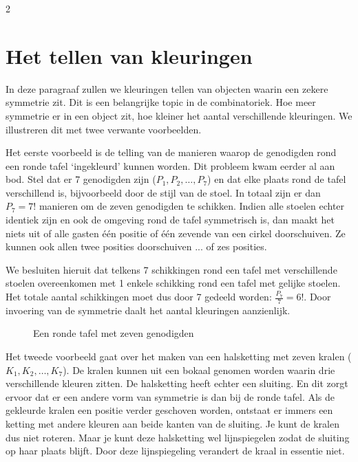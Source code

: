 \begin{multicols}{2}  
\section {Het tellen van kleuringen}
 
 In deze paragraaf zullen we kleuringen tellen van objecten waarin een zekere symmetrie zit. Dit is een belangrijke topic in de combinatoriek. Hoe meer symmetrie er in een object zit, hoe kleiner het aantal verschillende kleuringen. We illustreren dit met twee verwante voorbeelden.
 
 Het eerste voorbeeld is de telling van de manieren waarop de genodigden rond een ronde tafel `ingekleurd' kunnen worden. Dit probleem kwam eerder al aan bod. Stel dat er 7 genodigden zijn ($P_1, P_2, \dots, P_7$) en dat elke plaats rond de tafel verschillend is, bijvoorbeeld door de stijl van de stoel. In totaal zijn er dan $P_7=7!$ manieren om de zeven genodigden te schikken. Indien alle stoelen echter identiek zijn en ook de omgeving rond de tafel symmetrisch is, dan maakt het niets uit of alle gasten één positie of één zevende van een cirkel doorschuiven. Ze kunnen ook allen twee posities doorschuiven ... of zes posities. 

 We besluiten hieruit dat telkens 7 schikkingen rond een tafel met verschillende stoelen overeenkomen met 1 enkele schikking rond een tafel met gelijke stoelen. Het totale aantal schikkingen moet dus door 7 gedeeld worden: $\frac{P_7}{7}=6!$. Door invoering van de symmetrie daalt het aantal kleuringen aanzienlijk.
 
 \begin{figure}[H]
\centering
{}
\caption{Een ronde tafel met zeven genodigden}
\end{figure}

Het tweede voorbeeld gaat over het maken van een halsketting met zeven kralen ($K_1, K_2, \dots, K_7$). De kralen kunnen uit een bokaal genomen worden waarin drie verschillende kleuren zitten. De halsketting heeft echter een sluiting. En dit zorgt ervoor dat er een andere vorm van symmetrie is dan bij de ronde tafel. Als de gekleurde kralen een positie verder geschoven worden, ontstaat er immers een  ketting met andere kleuren aan beide kanten van de sluiting. Je kunt de kralen dus niet roteren. Maar je kunt deze halsketting wel lijnspiegelen zodat de sluiting op haar plaats blijft. Door deze lijnspiegeling verandert de kraal in essentie niet.


\end{multicols}
